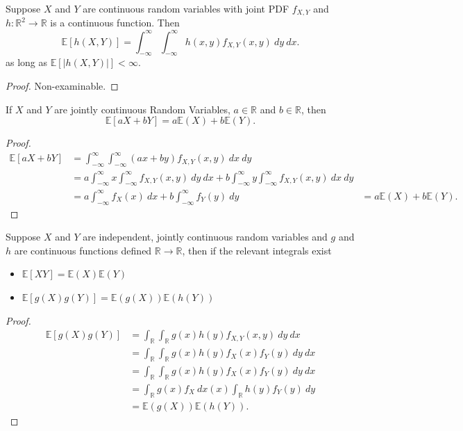 \begin{theorem}
  Suppose $X$ and $Y$ are continuous random variables with joint PDF $f_{X,Y}$ and $h : \mathbb{R}^2 \rightarrow \mathbb{R}$ is a continuous function.
  Then
  \[\mathbb{E}[h(X,Y)] = \int_{-\infty}^\infty \int_{-\infty}^\infty h(x, y) f_{X,Y}(x,y) \ dy \ dx.\]
  as long as $\mathbb{E}[|h(X,Y)|] < \infty$.
\end{theorem}
\begin{proof}
    Non-examinable.
\end{proof}

\begin{prop}
    If $X$ and $Y$ are jointly continuous Random Variables, $a \in \mathbb{R}$ and $b \in \mathbb{R}$, then
    \[\mathbb{E}[aX + bY] = a \mathbb{E}(X) + b \mathbb{E}(Y).\]
\end{prop}
\begin{proof}
    \begin{align*}
      \mathbb{E}[aX + bY] &= \int_{-\infty}^\infty  \int_{-\infty}^\infty (a x + b y) f_{X,Y}(x, y) \ dx \ dy \\
      &=  a \int_{-\infty}^\infty x \int_{-\infty}^\infty f_{X,Y}(x, y) \ dy \ dx + b \int_{-\infty}^\infty y \int_{-\infty}^\infty f_{X,Y}(x,y) \ dx \ dy \\
        &= a \int_{-\infty}^\infty f_X(x) \ dx + b \int_{-\infty}^\infty f_Y(y) \ dy
       &= a \mathbb{E}(X) + b \mathbb{E}(Y)
    .\end{align*}
\end{proof}

\begin{prop}
    Suppose $X$ and $Y$ are independent, jointly continuous random variables and $g$ and $h$ are continuous functions defined $\mathbb{R} \rightarrow \mathbb{R}$, then if the relevant integrals exist
    \begin{itemize}
      \item $\mathbb{E}[XY] = \mathbb{E}(X)\mathbb{E}(Y)$
      \item $\mathbb{E}[g(X) g(Y)] = \mathbb{E}(g(X))\mathbb{E}(h(Y))$
    \end{itemize}
\end{prop}
\begin{proof}
  \begin{align*}
    \mathbb{E}[g(X) g(Y)] &= \int_{\mathbb{R}} \int_{\mathbb{R}} g(x) h(y) f_{X,Y} (x, y) \ dy \ dx \\
     &= \int_{\mathbb{R}} \int_{\mathbb{R}} g(x) h(y) f_{X} (x) f_{Y}(y) \ dy \ dx \\
     &= \int_{\mathbb{R}} \int_{\mathbb{R}} g(x) h(y) f_{X} (x) f_{Y}(y) \ dy \ dx \\
     &= \int_{\mathbb{R}}  g(x)f_{X} \ dx   (x) \int_{\mathbb{R}} h(y) f_{Y}(y) \ dy  \\
      &= \mathbb{E}(g(X))\mathbb{E}(h(Y))
  .\end{align*}
\end{proof}

